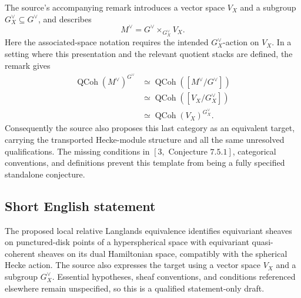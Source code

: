 \documentclass[11pt]{article}
\begin{document}
The source's accompanying remark introduces a vector space \(V_X\) and a subgroup \(G_X^\vee\subseteq G^\vee\), and describes
\[
M^\vee=G^\vee\times_{G_X^\vee}V_X.
\]
Here the associated-space notation requires the intended \(G_X^\vee\)-action on \(V_X\). In a setting where this presentation and the relevant quotient stacks are defined, the remark gives
\[
\begin{aligned}
\operatorname{QCoh}(M^\vee)^{G^\vee}
&\simeq\operatorname{QCoh}([M^\vee/G^\vee])\\
&\simeq\operatorname{QCoh}([V_X/G_X^\vee])\\
&\simeq\operatorname{QCoh}(V_X)^{G_X^\vee}.
\end{aligned}
\]
Consequently the source also proposes this last category as an equivalent target, carrying the transported Hecke-module structure and all the same unresolved qualifications. The missing conditions in \([3,\text{ Conjecture }7.5.1]\), categorical conventions, and definitions prevent this template from being a fully specified standalone conjecture.
\subsection{Short English statement}
The proposed local relative Langlands equivalence identifies equivariant sheaves on punctured-disk points of a hyperspherical space with equivariant quasi-coherent sheaves on its dual Hamiltonian space, compatibly with the spherical Hecke action. The source also expresses the target using a vector space \(V_X\) and a subgroup \(G_X^\vee\). Essential hypotheses, sheaf conventions, and conditions referenced elsewhere remain unspecified, so this is a qualified statement-only draft.
\end{document}
